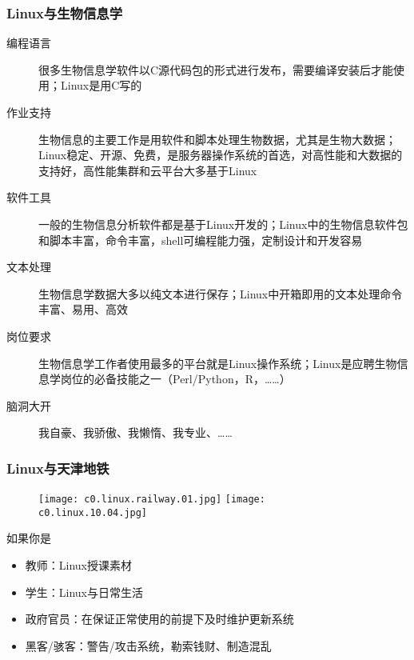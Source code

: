 \begin{frame}
\end{frame}

\begin{frame}
  \frametitle{Linux与生物信息学}
  \begin{description}
    \item[编程语言] 很多生物信息学软件以C源代码包的形式进行发布，需要编译安装后才能使用；Linux是用C写的
    \item[作业支持] 生物信息的主要工作是用软件和脚本处理生物数据，尤其是生物大数据；Linux稳定、开源、免费，是服务器操作系统的首选，对高性能和大数据的支持好，高性能集群和云平台大多基于Linux
    \item[软件工具] 一般的生物信息分析软件都是基于Linux开发的；Linux中的生物信息软件包和脚本丰富，命令丰富，shell可编程能力强，定制设计和开发容易
    \item[文本处理] 生物信息学数据大多以纯文本进行保存；Linux中开箱即用的文本处理命令丰富、易用、高效
    \item[岗位要求] 生物信息学工作者使用最多的平台就是Linux操作系统；Linux是应聘生物信息学岗位的必备技能之一（Perl/Python，R，……）
    \item[脑洞大开] 我自豪、我骄傲、我懒惰、我专业、……
  \end{description}
\end{frame}

\begin{frame}
  \frametitle{Linux与天津地铁}
  \begin{figure}
    \centering
    \texttt{[image: c0.linux.railway.01.jpg]}\quad
    \texttt{[image: c0.linux.10.04.jpg]}
  \end{figure}
  \pause
  \begin{block}{如果你是}
    \begin{itemize}
      \item 教师：Linux授课素材
      \item 学生：Linux与日常生活
      \item 政府官员：在保证正常使用的前提下及时维护更新系统
      \item 黑客/骇客：警告/攻击系统，勒索钱财、制造混乱
    \end{itemize}
  \end{block}
\end{frame}

